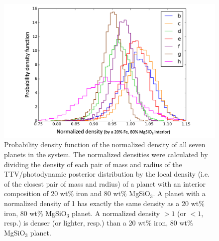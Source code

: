 \documentclass[fleqn,usenatbib]{mnras} %
\begin{document}
\begin{figure}
    \centering
    \includegraphics[width=\hsize]{figures/figure_TTV_norm_density_histograms.png}
    \caption{Probability density function of the normalized density of all seven planets in the system.
    The normalized densities were calculated by dividing the density of each pair of mass and radius of the TTV/photodynamic posterior distribution by the local density (i.e. of the closest pair of mass and radius) of a planet with an interior composition of 20 wt\% iron and 80 wt\% MgSiO$_3$. A planet with a normalized density of 1 has exactly the same density as a 20 wt\% iron, 80 wt\% MgSiO$_3$ planet. A normalized density ${>}1$ (or ${<}1$, resp.) is denser (or lighter, resp.) than a 20 wt\% iron, 80 wt\% MgSiO$_3$ planet.}
    \label{fig:norm_density_histo}
\end{figure}
\end{document}
